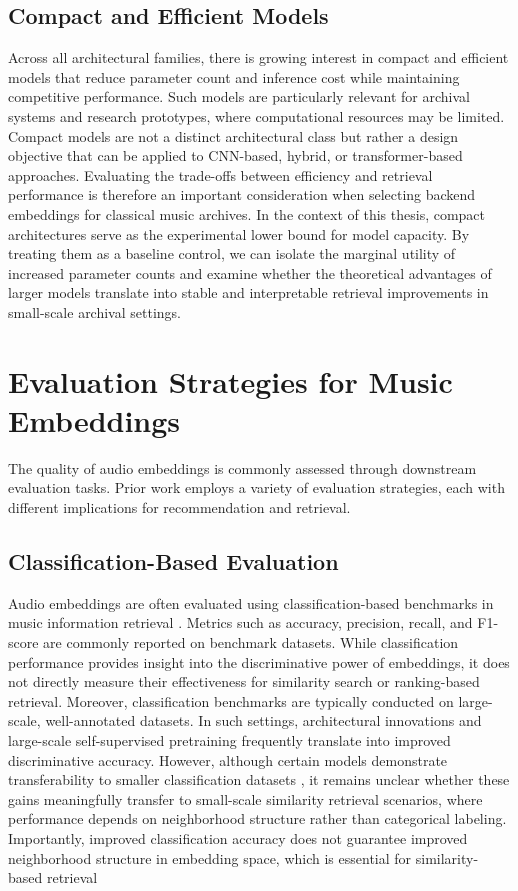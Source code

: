 \subsection{Compact and Efficient Models}
Across all architectural families, there is growing interest in compact and efficient models that reduce parameter count and inference cost while maintaining competitive performance. Such models are particularly relevant for archival systems and research prototypes, where computational resources may be limited.
Compact models are not a distinct architectural class but rather a design objective that can be applied to CNN-based, hybrid, or transformer-based approaches. Evaluating the trade-offs between efficiency and retrieval performance is therefore an important consideration when selecting backend embeddings for classical music archives.
In the context of this thesis, compact architectures serve as the experimental lower bound for model capacity. 
By treating them as a baseline control, we can isolate the marginal utility of increased parameter counts and examine whether the theoretical advantages of larger models translate into stable and interpretable retrieval improvements in small-scale archival settings.



\section{Evaluation Strategies for Music Embeddings}
The quality of audio embeddings is commonly assessed through downstream evaluation tasks. Prior work employs a variety of evaluation strategies, each with different implications for recommendation and retrieval.

\subsection{Classification-Based Evaluation}
Audio embeddings are often evaluated using classification-based benchmarks in music information retrieval \cite{gong2021ast, lin2024}. 
Metrics such as accuracy, precision, recall, and F1-score are commonly reported on benchmark datasets. 
While classification performance provides insight into the discriminative power of embeddings, it does not directly measure their effectiveness for similarity search or ranking-based retrieval.
Moreover, classification benchmarks are typically conducted on large-scale, well-annotated datasets. 
In such settings, architectural innovations and large-scale self-supervised pretraining frequently translate into improved discriminative accuracy. 
However, although certain models demonstrate transferability to smaller classification datasets \cite{gong2021ast}, it remains unclear whether these gains meaningfully transfer to small-scale similarity retrieval scenarios, where performance depends on neighborhood structure rather than categorical labeling.
Importantly, improved classification accuracy does not guarantee improved neighborhood structure in embedding space, which is essential for similarity-based retrieval \cite{tamm2024}


